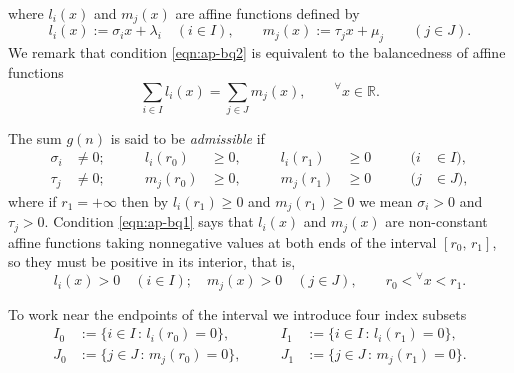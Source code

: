 \documentclass[a4paper,12pt]{article}
\theoremstyle{plain}
\begin{document}
where $l_i(x)$ and $m_j(x)$ are affine functions defined by  
\begin{equation*} 
l_i(x) := \sigma_i x + \lambda_i \quad (i \in I), \qquad 
m_j(x) := \tau_j x + \mu_j \qquad (j \in J). 
\end{equation*}
We remark that condition \eqref{eqn:ap-bq2} is equivalent to the balancedness of 
affine functions  
\begin{equation} \label{eqn:balanced}
\sum_{i \in I} l_i(x) = \sum_{j \in J} m_j(x),  
\qquad {}^{\forall} x \in \mathbb{R}. 
\end{equation}
\par
The sum $g(n)$ is said to be {\sl admissible} if   
\begin{subequations} \label{eqn:ap-bq1}
\begin{alignat}{4} 
\sigma_i &\neq 0; \qquad & l_i( r_0 ) &\ge 0, \qquad & 
l_i( r_1 ) &\ge 0 \qquad & (i &\in I), 
\label{eqn:ap-bq11} \\ 
\tau_j &\neq 0; \qquad & m_j( r_0 ) &\ge 0, \qquad & 
m_j( r_1 ) &\ge 0 \qquad & (j &\in J),    
\label{eqn:ap-bq12} 
\end{alignat}
\end{subequations}
where if $r_1 = +\infty$ then by $l_i( r_1 ) \ge 0$ and $m_j( r_1 ) \ge 0$ we mean 
$\sigma_i > 0$ and $\tau_j > 0$. 
Condition \eqref{eqn:ap-bq1} says that $l_i(x)$ and $m_j(x)$ are non-constant affine functions 
taking nonnegative values at both ends of the interval $[r_0, \, r_1]$, so they must be 
positive in its interior, that is,   
\begin{equation} \label{eqn:positive}
l_i(x) > 0 \quad (i \in I); \quad m_j(x) > 0 \quad (j \in J), 
\qquad r_0 < {}^{\forall} x < r_1.  
\end{equation}  
\par
To work near the endpoints of the interval we introduce four index subsets       
\begin{subequations} \label{eqn:IJ01}
\begin{alignat}{2}
I_0 &:= \{ i \in I \,:\, l_i( r_0 ) = 0 \}, \qquad & I_1 &:= \{ i \in I \,:\, l_i( r_1 ) = 0 \},  \label{eqn:I01} \\
J_0 &:= \{ j \in J \,:\, m_j( r_0 ) = 0 \}, \qquad & J_1 &:= \{ j \in J \,:\, m_j( r_1 ) = 0 \}.  \label{eqn:J01} 
\end{alignat}
\end{subequations}
\end{document}
